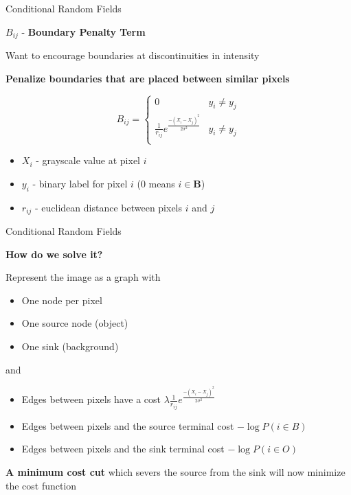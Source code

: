 \documentclass[10pt]{beamer}
\begin{document}
\begin{frame}[fragile]{Conditional Random Fields}

  $B_{ij}$ - \textbf{Boundary Penalty Term}

  Want to encourage boundaries at discontinuities in intensity
  
  \textbf{Penalize boundaries that are placed between similar pixels}

  \pause  
  \begin{equation} B_{ij} = \begin{cases}
      0 & y_{i} \neq y_{j} \\
      \frac{1}{r_{ij}} e^{\frac{-(X_{i}-X_{j})^2}{2\sigma^2}} & y_{i} \neq y_{j} \\
    \end{cases}
    \label{eq:boundTerm}
  \end{equation}

  \begin{itemize}
  \item $X_{i}$ - grayscale value at pixel $i$
  \item $y_{i}$ - binary label for pixel $i$ (0 means $i \in \mathbf{B}$)
  \item $r_{ij}$ - euclidean distance between pixels $i$ and $j$
  \end{itemize}
    
\end{frame}

\begin{frame}[fragile]{Conditional Random Fields}

  \textbf{How do we solve it?}

  Represent the image as a graph with
  \begin{itemize}
  \item One node per pixel
  \item One source node (object)
  \item One sink (background)
  \end{itemize}

  \pause
  and
  
  \begin{itemize}
  \item Edges between pixels have a cost $\lambda \frac{1}{r_{ij}} e^{\frac{-(X_{i}-X_{j})^2}{2\sigma^2}}$
  \item Edges between pixels and the source terminal cost  $-\log P(i \in B)$
  \item Edges between pixels and the sink terminal cost  $-\log P(i \in O)$
  \end{itemize}
  
  \textbf{A minimum cost cut} which severs the source from the sink will now minimize the cost function
  
\end{frame}
\end{document}
